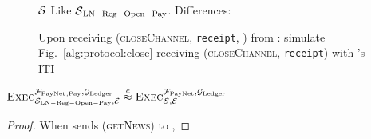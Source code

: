 \begin{figure}[H]
  \begin{simulatorbox}{$\mathcal{S}$}
    Like $\mathcal{S}{}_{\mathrm{LN - Reg - Open - Pay}}$. Differences:
    \begin{algorithmic}[1]
      \State Upon receiving (\textsc{closeChannel}, \texttt{receipt}, \alice)
      from \fpaynet:
      \Indent
        \State simulate Fig.~\ref{alg:protocol:close} receiving
        (\textsc{closeChannel}, \texttt{receipt}) with \alice's ITI
        \label{alg:sim:close}
      \EndIndent
    \end{algorithmic}
  \end{simulatorbox}
  \caption{}
  \label{alg:sim:close}
\end{figure}

\begin{lemma}
  \label{lemma:close}
  $\textsc{Exec}^{\mathcal{F}_{\mathrm{PayNet}}{}_{\mathrm{, Pay}}, \mathcal{G}_{\mathrm{Ledger}}}_{\mathcal{S}_{\mathrm{LN
  - Reg - Open - Pay}}, \mathcal{E}} \overset{c}{\approx}
  \textsc{Exec}^{\mathcal{F}_{\mathrm{PayNet}}, \mathcal{G}_{\mathrm{Ledger}}}_{\mathcal{S}, \mathcal{E}}$
\end{lemma}

\begin{proof}
  When \environment{} sends (\textsc{getNews}) to \alice,
\end{proof}
